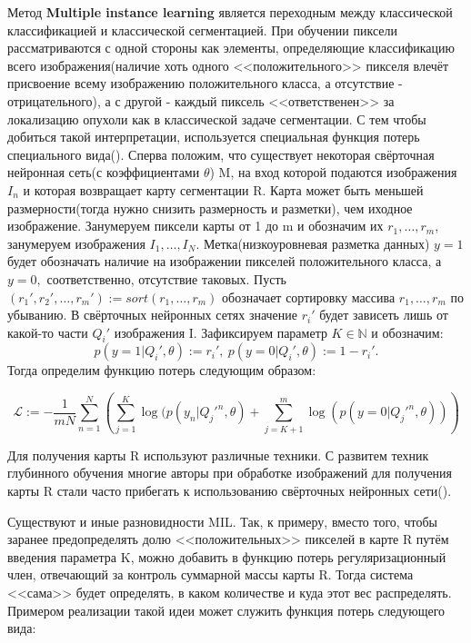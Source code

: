 Метод {\bf Multiple instance learning} является переходным между классической классификацией и классической сегментацией.
При обучении пиксели рассматриваются с одной стороны как элементы, определяющие классификацию всего изображения(наличие хоть одного
<<положительного>> пикселя влечёт присвоение всему изображению положительного класса, а отсутствие - отрицательного), а с другой - 
каждый пиксель <<ответственен>> за локализацию опухоли как в классической задаче сегментации. С тем чтобы добиться такой интерпретации, 
используется специальная функция потерь специального вида(\cite{zhu_deep_2016}). Сперва положим, что существует некоторая свёрточная нейронная сеть(с коэффициентами $\theta$) M, на вход которой подаются изображения $I_n$ и которая возвращает карту сегментации R. Карта может быть меньшей размерности(тогда нужно снизить размерность и разметки), чем иходное изображение. Занумеруем пиксели карты  от 1 до m и обозначим их $r_1, \dots, r_m$, занумеруем изображения $I_1, \dots, I_N$. Метка(низкоуровневая разметка данных) $y=1$ будет обозначать наличие на изображении пикселей положительного класса, а $y = 0,$  соответственно, отсутствие таковых. Пусть $(r_1', r_2',\dots, r_m') := sort(r_1, \dots, r_m )$ обозначает сортировку массива $r_1, \dots, r_m$ по убыванию. В свёрточных нейронных сетях значение $r_i'$ будет зависеть лишь от какой-то части $Q_i'$ изображения I. Зафиксируем параметр $K\in\mathbb{N}$ и обозначим: 
$$p(y=1|Q_i', \theta):= r_i', ~p(y=0|Q_i', \theta):= 1 - r_i'.$$ Тогда определим функцию потерь следующим образом:

\begin{equation}
  \label{eq:equation1}
  \mathcal{L} := -\frac{1}{mN}\sum_{n=1}^N\left( \sum_{j=1}^K\log(p(y_n|Q_{j}'^n,\theta)+\sum_{j=K+1}^m\log(p(y=0|Q_{j}'^n,\theta))\right)
\end{equation}


Для получения карты R используют различные техники.  С развитем техник глубинного обучения многие авторы при обработке изображений 
для получения карты R стали часто прибегать к использованию свёрточных нейронных сети(\cite{quellec_multiple-instance_2017}).

Существуют и иные разновидности MIL. Так, к примеру, вместо того, чтобы заранее предопределять долю <<положительных>> пикселей в карте R путём введения параметра K, можно добавить в функцию потерь регуляризационный член, отвечающий за контроль суммарной массы карты R. Тогда система <<сама>> будет определять, в каком количестве и куда этот вес распределять. Примером реализации такой идеи может служить функция потерь следующего вида: 


